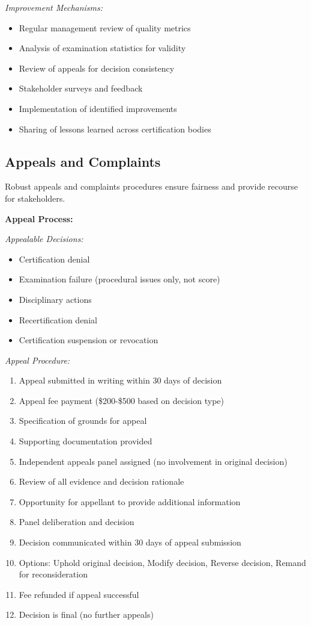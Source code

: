 \documentclass[11pt,a4paper]{article}
\begin{document}
\textit{Improvement Mechanisms:}
\begin{itemize}
\item Regular management review of quality metrics
\item Analysis of examination statistics for validity
\item Review of appeals for decision consistency
\item Stakeholder surveys and feedback
\item Implementation of identified improvements
\item Sharing of lessons learned across certification bodies
\end{itemize}

\subsection{Appeals and Complaints}

Robust appeals and complaints procedures ensure fairness and provide recourse for stakeholders.

\textbf{Appeal Process:}

\textit{Appealable Decisions:}
\begin{itemize}
\item Certification denial
\item Examination failure (procedural issues only, not score)
\item Disciplinary actions
\item Recertification denial
\item Certification suspension or revocation
\end{itemize}

\textit{Appeal Procedure:}
\begin{enumerate}
\item Appeal submitted in writing within 30 days of decision
\item Appeal fee payment (\$200-\$500 based on decision type)
\item Specification of grounds for appeal
\item Supporting documentation provided

\item Independent appeals panel assigned (no involvement in original decision)
\item Review of all evidence and decision rationale
\item Opportunity for appellant to provide additional information
\item Panel deliberation and decision

\item Decision communicated within 30 days of appeal submission
\item Options: Uphold original decision, Modify decision, Reverse decision, Remand for reconsideration
\item Fee refunded if appeal successful
\item Decision is final (no further appeals)
\end{enumerate}
\end{document}
